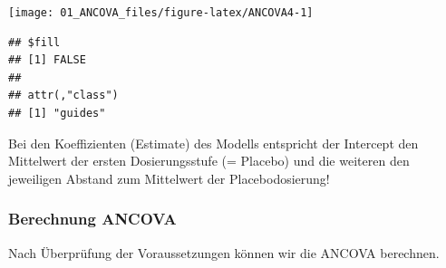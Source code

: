 \documentclass[]{article}
\begin{document}
\begin{center}\texttt{[image: 01\_ANCOVA\_files/figure-latex/ANCOVA4-1]} \end{center}

\begin{verbatim}
## $fill
## [1] FALSE
## 
## attr(,"class")
## [1] "guides"
\end{verbatim}

Bei den Koeffizienten (Estimate) des Modells entspricht der Intercept
den Mittelwert der ersten Dosierungsstufe (= Placebo) und die weiteren
den jeweiligen Abstand zum Mittelwert der Placebodosierung!

\subsubsection*{Berechnung ANCOVA}\label{berechnung-ancova}

Nach Überprüfung der Voraussetzungen können wir die ANCOVA berechnen.
\end{document}

